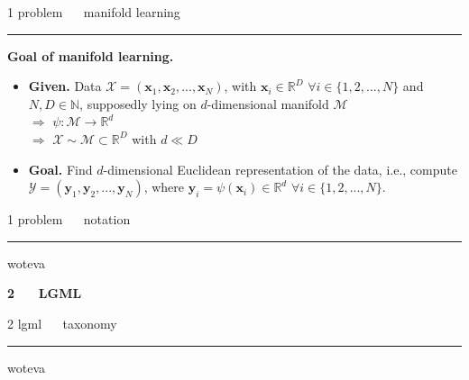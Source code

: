 \documentclass[11pt, compress, t, notes = noshow, xcolor = table, 
aspectratio = 1610]{beamer}
\newcommand{\highlight}[1]{\textcolor{highlightcol}{\textbf{#1}}}
\newcommand{\arritem}{\item[\highlight{$\rightarrow$}]}
\newcommand{\mani}{\mathcal{M}}
\newcommand{\N}{\mathbb{N}}
\newcommand{\R}{\mathbb{R}}
\newcommand{\RD}{\mathbb{R}^D}
\newcommand{\Rd}{\mathbb{R}^d}
\newcommand{\setN}{\{1, 2, ..., N\}}
\newcommand{\X}{\mathcal{X}}
\newcommand{\x}{\bm{x}}
\newcommand{\Y}{\mathcal{Y}}
\newcommand{\y}{\bm{y}}
\begin{document}
\LARGE
\begin{frame}{\textcolor{gray!90}{1 problem} ~~ manifold learning}
\normalsize
\vspace{-0.5cm}
\noindent \textcolor{gray!90}{\rule{\textwidth}{1pt}}
\smallskip

\textbf{Goal of manifold learning.}
\medskip
\begin{itemize}
  \arritem \textbf{Given.} Data $\X = (\x_1, \x_2, ..., \x_N)$, with $\x_i \in 
  \RD$ $\forall i \in \setN$ and $N, D \in \N$, supposedly lying on 
  $d$-dimensional manifold $\mani$ \\
  $\Rightarrow$ $\psi: \mani \rightarrow \Rd$ \\
  $\Rightarrow$ $\X \sim \mani \subset \RD$ with $d \ll D$ 
  \medskip
  \arritem \textbf{Goal.} Find $d$-dimensional Euclidean representation of the 
  data, i.e., compute $\Y = (\y_1, \y_2, ..., \y_N)$, where 
  $\y_i = \psi(\x_i) \in \R^d$ $\forall i \in \setN$.
\end{itemize}

\end{frame}


\LARGE
\begin{frame}{\textcolor{gray!90}{1 problem} ~~ notation}
\normalsize
\vspace{-0.5cm}
\noindent \textcolor{gray!90}{\rule{\textwidth}{1pt}}


\medskip

woteva

\end{frame}


\begin{frame}{}

\Huge
\hspace{0pt}
\vfill
\textbf{\highlight{2 ~~ LGML}}
\vfill
\hspace{0pt}

\end{frame}


\LARGE
\begin{frame}{\textcolor{gray!90}{2 lgml} ~~ taxonomy}
\normalsize
\vspace{-0.5cm}
\noindent \textcolor{gray!90}{\rule{\textwidth}{1pt}}


\medskip

woteva

\end{frame}
\end{document}
